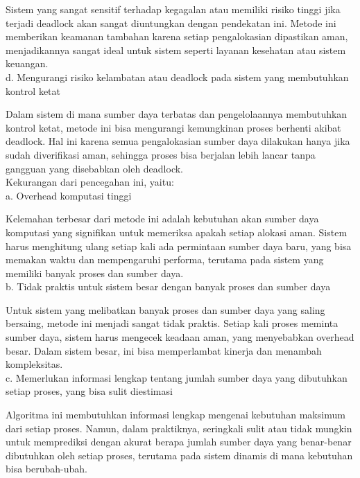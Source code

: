 \documentclass[12pt]{article}
\begin{document}
    Sistem yang sangat sensitif terhadap kegagalan atau memiliki risiko tinggi jika terjadi deadlock akan sangat diuntungkan dengan pendekatan ini. Metode ini memberikan keamanan tambahan karena setiap pengalokasian dipastikan aman, menjadikannya sangat ideal untuk sistem seperti layanan kesehatan atau sistem keuangan.\\

    d.	Mengurangi risiko kelambatan atau deadlock pada sistem yang membutuhkan kontrol ketat
    
    Dalam sistem di mana sumber daya terbatas dan pengelolaannya membutuhkan kontrol ketat, metode ini bisa mengurangi kemungkinan proses berhenti akibat deadlock. Hal ini karena semua pengalokasian sumber daya dilakukan hanya jika sudah diverifikasi aman, sehingga proses bisa berjalan lebih lancar tanpa gangguan yang disebabkan oleh deadlock.\\
    
    Kekurangan dari pencegahan ini, yaitu:\\

	a. Overhead komputasi tinggi

    Kelemahan terbesar dari metode ini adalah kebutuhan akan sumber daya komputasi yang signifikan untuk memeriksa apakah setiap alokasi aman. Sistem harus menghitung ulang setiap kali ada permintaan sumber daya baru, yang bisa memakan waktu dan mempengaruhi performa, terutama pada sistem yang memiliki banyak proses dan sumber daya.\\

	b. Tidak praktis untuk sistem besar dengan banyak proses dan sumber daya

    Untuk sistem yang melibatkan banyak proses dan sumber daya yang saling bersaing, metode ini menjadi sangat tidak praktis. Setiap kali proses meminta sumber daya, sistem harus mengecek keadaan aman, yang menyebabkan overhead besar. Dalam sistem besar, ini bisa memperlambat kinerja dan menambah kompleksitas.\\

	c. Memerlukan informasi lengkap tentang jumlah sumber daya yang dibutuhkan setiap proses, yang bisa sulit diestimasi

    Algoritma ini membutuhkan informasi lengkap mengenai kebutuhan maksimum dari setiap proses. Namun, dalam praktiknya, seringkali sulit atau tidak mungkin untuk memprediksi dengan akurat berapa jumlah sumber daya yang benar-benar dibutuhkan oleh setiap proses, terutama pada sistem dinamis di mana kebutuhan bisa berubah-ubah.\\
\end{document}
